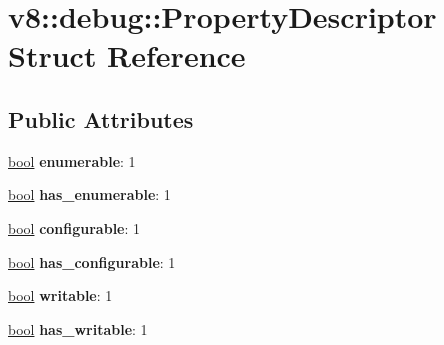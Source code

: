 \hypertarget{structv8_1_1debug_1_1PropertyDescriptor}{}\section{v8\+:\+:debug\+:\+:Property\+Descriptor Struct Reference}
\label{structv8_1_1debug_1_1PropertyDescriptor}
\subsection*{Public Attributes}
\begin{DoxyCompactItemize}
\item 
\mbox{\label{structv8_1_1debug_1_1PropertyDescriptor_ad5fbb0012f7ca352f8fa0cc81dea5c44}} 
\mbox{\hyperlink{classbool}{bool}} {\bfseries enumerable}\+: 1
\item 
\mbox{\label{structv8_1_1debug_1_1PropertyDescriptor_aa765f162facd9a352af192629e9ca77a}} 
\mbox{\hyperlink{classbool}{bool}} {\bfseries has\+\_\+enumerable}\+: 1
\item 
\mbox{\label{structv8_1_1debug_1_1PropertyDescriptor_acdcb3430aab04266aedfa72facc1312c}} 
\mbox{\hyperlink{classbool}{bool}} {\bfseries configurable}\+: 1
\item 
\mbox{\label{structv8_1_1debug_1_1PropertyDescriptor_a8fdd5a461efcc35f1d3cdc6e54b9e4a2}} 
\mbox{\hyperlink{classbool}{bool}} {\bfseries has\+\_\+configurable}\+: 1
\item 
\mbox{\label{structv8_1_1debug_1_1PropertyDescriptor_a0809c8274c37c6fb41ab091d3f10545c}} 
\mbox{\hyperlink{classbool}{bool}} {\bfseries writable}\+: 1
\item 
\mbox{\label{structv8_1_1debug_1_1PropertyDescriptor_a73c0eefffc0f3c939048dab8d39026c0}} 
\mbox{\hyperlink{classbool}{bool}} {\bfseries has\+\_\+writable}\+: 1
\item 
\mbox{\label{structv8_1_1debug_1_1PropertyDescriptor_a17136ae3c175f6b8680272f3ef34c1f5}} 

\end{DoxyCompactItemize}
